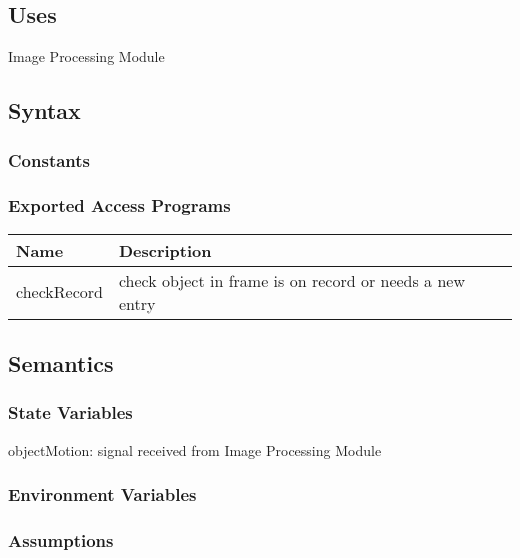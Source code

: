 \documentclass[12pt, titlepage]{article}
\begin{document}
\subsection{Uses}
Image Processing Module

\subsection{Syntax}

\subsubsection{Constants}


\subsubsection{Exported Access Programs}

\begin{center}
\begin{tabular}{p{4cm} p{8cm} }
\hline
\textbf{Name} & \textbf{Description}  \\
\hline
checkRecord & check object in frame is on record or needs a new entry\\
\hline
\end{tabular}
\end{center}
\subsection{Semantics}

\subsubsection{State Variables}
objectMotion: signal received from Image Processing Module 


\subsubsection{Environment Variables}



\subsubsection{Assumptions}

\end{document}
